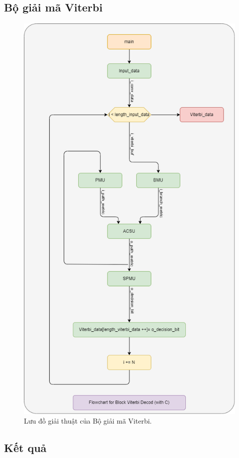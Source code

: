 \subsection{Bộ giải mã Viterbi}

\begin{figure}[H]
	\centering
	\includegraphics[width=.6\linewidth]{sections/pic/mophongbangC/flowchart_VD_312.png}
	\caption{Lưu đồ giải thuật của Bộ giải mã Viterbi.}
\end{figure}

\subsection{Kết quả}

